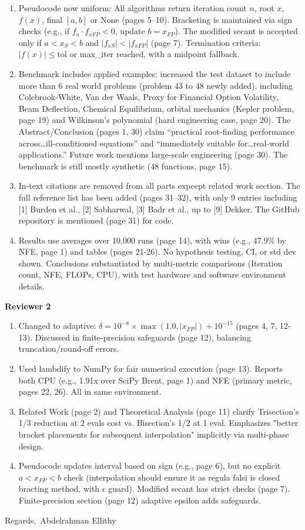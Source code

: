 \documentclass{article}
\begin{document}
\begin{enumerate}
\item Pseudocode now uniform: All algorithms return iteration count \(n\), root \(x\), \(f(x)\), final \([a,b]\) or None (pages 5--10). Bracketing is maintained via sign checks (e.g., if \(f_a \cdot f_{xFP} < 0\), update \(b = x_{FP}\)). The modified secant is accepted only if \(a < x_S < b\) and \(|f_{xS}| < |f_{xFP}|\) (page 7). Termination criteria: \(|f(x)| \leq \text{tol}\) or max\_iter reached, with a midpoint fallback.
\item Benchmark includes applied examples: increased the test dataset to include more than 6 real world problems (problem 43 to 48 newly added), including Colebrook-White, Van der Waals, Proxy for Financial Option Volatility, Beam Deflection, Chemical Equilibrium, orbital mechanics (Kepler problem, page 19) and Wilkinson's polynomial (hard engineering case, page 20). The Abstract/Conclusion (pages 1, 30) claim ``practical root-finding performance across\ldots ill-conditioned equations'' and ``immediately suitable for\ldots real-world applications.'' Future work mentions large-scale engineering (page 30). The benchmark is still mostly synthetic (48 functions, page 15).
\item In-text citations are removed from all parts expcept related work section. The full reference list has been added (pages 31--32), with only 9 entries including [1] Burden et al., [2] Sabharwal, [3] Badr et al., up to [9] Dekker. The GitHub repository is mentioned (page 31) for code.
\item Results use averages over 10,000 runs (page 14), with wins (e.g., 47.9\% by NFE, page 1) and tables (pages 21-26). No hypothesis testing, CI, or std dev shown. Conclusions substantiated by multi-metric comparisons (Iteration count, NFE, FLOPs, CPU), with test hardware and software environment details.
\end{enumerate}

\textbf{Reviewer 2}
\begin{enumerate}
\item Changed to adaptive: $\delta = 10^{-8} \times \max(1.0, |x_{FP}|) + 10^{-15}$ (pages 4, 7, 12-13). Discussed in finite-precision safeguards (page 12), balancing truncation/round-off errors.
\item Used lambdify to NumPy for fair numerical execution (page 13). Reports both CPU (e.g., 1.91x over SciPy Brent, page 1) and NFE (primary metric, pages 22, 26). All in same environment.
\item Related Work (page 2) and Theoretical Analysis (page 11) clarify Trisection's 1/3 reduction at 2 evals cost vs. Bisection's 1/2 at 1 eval. Emphasizes "better bracket placements for subsequent interpolation" implicitly via multi-phase design.
\item Pseudocode updates interval based on sign (e.g., page 6), but no explicit $a < x_{FP} < b$ check (interpolation should ensure it as regula falsi is closed bracting method, with $\epsilon$ guard). Modified secant has strict checks (page 7). Finite-precision section (page 12) adaptive epsilon adds safeguards.
\end{enumerate}

Regards,\
Abdelrahman Ellithy
\end{document}
